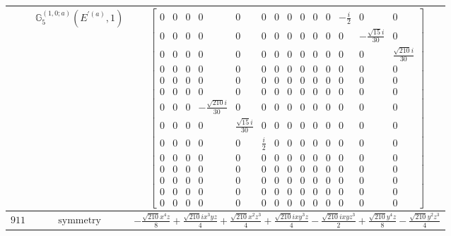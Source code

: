 \documentclass[fleqn,8pt,landscape]{jsarticle}
\begin{document}
\begin{longtable}{ccc}
$  $ & $ \mathbb{G}_{5}^{(1,0;a)}(E^{\prime(a)},1) $ & $ \begin{bmatrix} 0 & 0 & 0 & 0 & 0 & 0 & 0 & 0 & 0 & 0 & 0 & - \frac{i}{2} & 0 & 0 \\ 0 & 0 & 0 & 0 & 0 & 0 & 0 & 0 & 0 & 0 & 0 & 0 & - \frac{\sqrt{15} i}{30} & 0 \\ 0 & 0 & 0 & 0 & 0 & 0 & 0 & 0 & 0 & 0 & 0 & 0 & 0 & \frac{\sqrt{210} i}{30} \\ 0 & 0 & 0 & 0 & 0 & 0 & 0 & 0 & 0 & 0 & 0 & 0 & 0 & 0 \\ 0 & 0 & 0 & 0 & 0 & 0 & 0 & 0 & 0 & 0 & 0 & 0 & 0 & 0 \\ 0 & 0 & 0 & 0 & 0 & 0 & 0 & 0 & 0 & 0 & 0 & 0 & 0 & 0 \\ 0 & 0 & 0 & - \frac{\sqrt{210} i}{30} & 0 & 0 & 0 & 0 & 0 & 0 & 0 & 0 & 0 & 0 \\ 0 & 0 & 0 & 0 & \frac{\sqrt{15} i}{30} & 0 & 0 & 0 & 0 & 0 & 0 & 0 & 0 & 0 \\ 0 & 0 & 0 & 0 & 0 & \frac{i}{2} & 0 & 0 & 0 & 0 & 0 & 0 & 0 & 0 \\ 0 & 0 & 0 & 0 & 0 & 0 & 0 & 0 & 0 & 0 & 0 & 0 & 0 & 0 \\ 0 & 0 & 0 & 0 & 0 & 0 & 0 & 0 & 0 & 0 & 0 & 0 & 0 & 0 \\ 0 & 0 & 0 & 0 & 0 & 0 & 0 & 0 & 0 & 0 & 0 & 0 & 0 & 0 \\ 0 & 0 & 0 & 0 & 0 & 0 & 0 & 0 & 0 & 0 & 0 & 0 & 0 & 0 \\ 0 & 0 & 0 & 0 & 0 & 0 & 0 & 0 & 0 & 0 & 0 & 0 & 0 & 0 \end{bmatrix} $ \\ \hline
$ 911 $ & $ \text{symmetry} $ & $ - \frac{\sqrt{210} x^{4} z}{8} + \frac{\sqrt{210} i x^{3} y z}{4} + \frac{\sqrt{210} x^{2} z^{3}}{4} + \frac{\sqrt{210} i x y^{3} z}{4} - \frac{\sqrt{210} i x y z^{3}}{2} + \frac{\sqrt{210} y^{4} z}{8} - \frac{\sqrt{210} y^{2} z^{3}}{4} $ \\

\end{longtable}
\end{document}
